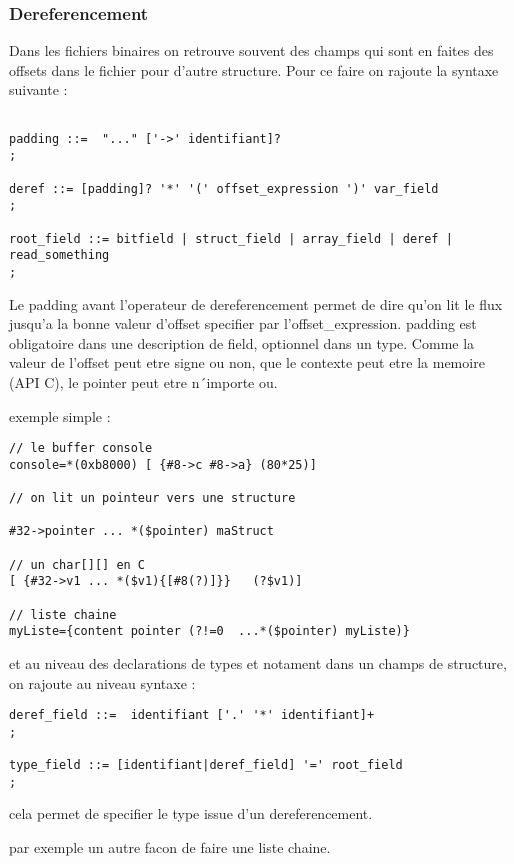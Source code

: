 \documentclass[11pt]{report}
\begin{document}
\subsubsection{Dereferencement}

Dans les fichiers binaires on retrouve souvent des champs qui sont en
faites des offsets dans le fichier pour d'autre structure.
Pour ce faire on rajoute la syntaxe suivante :

\begin{lstlisting}

padding ::=  "..." ['->' identifiant]?
;

deref ::= [padding]? '*' '(' offset_expression ')' var_field
;

root_field ::= bitfield | struct_field | array_field | deref | read_something
;
\end{lstlisting}

Le padding avant l'operateur de dereferencement permet de dire qu'on lit le flux jusqu'a la bonne valeur d'offset
specifier par l'offset\_expression. padding est obligatoire dans une description de field, optionnel dans un type.
Comme la valeur de l'offset peut etre signe ou non, que le contexte peut etre la memoire (API C), le pointer peut etre 
n´importe ou.

exemple simple :

\begin{lstlisting}
// le buffer console
console=*(0xb8000) [ {#8->c #8->a} (80*25)]

// on lit un pointeur vers une structure

#32->pointer ... *($pointer) maStruct  

// un char[][] en C
[ {#32->v1 ... *($v1){[#8(?)]}}   (?$v1)] 

// liste chaine
myListe={content pointer (?!=0  ...*($pointer) myListe)} 
\end{lstlisting} %

et au niveau des declarations de types et notament dans un champs de structure, on rajoute au niveau syntaxe :

\begin{lstlisting}
deref_field ::=  identifiant ['.' '*' identifiant]+
;

type_field ::= [identifiant|deref_field] '=' root_field
;
\end{lstlisting}

cela permet de specifier le type issue d'un dereferencement.

par exemple un autre facon de faire une liste chaine.
\end{document}
